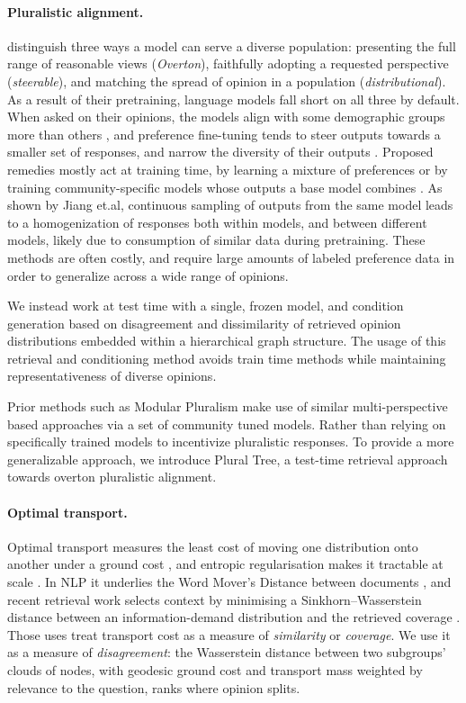 \documentclass[11pt]{article}
\begin{document}
\paragraph{Pluralistic alignment.}
\citet{sorensen2024roadmap} distinguish three ways a model can serve a diverse
population: presenting the full range of reasonable views (\emph{Overton}),
faithfully adopting a requested perspective (\emph{steerable}), and matching
the spread of opinion in a population (\emph{distributional}). As a result of their pretraining, language models
fall short on all three by default. When asked on their opinions, the models align with some
demographic groups more than others \citep{santurkar2023whose,
durmus2023towards}, and preference fine-tuning tends to steer outputs towards a smaller set of responses, and narrow the diversity
of their outputs \citep{kirk2024understanding}. Proposed remedies mostly act at
training time,  by learning a mixture of preferences
\citep{chakraborty2024maxmin} or by training community-specific models whose
outputs a base model combines \citep{feng-etal-2024-modular}. As shown by Jiang et.al, continuous sampling of outputs from the same model leads to a homogenization of responses both within models, and between different models, likely due to consumption of similar data during pretraining. These methods are often costly, and require large amounts of labeled preference data in order to generalize across a wide range of opinions.


We instead work
at test time with a single, frozen model, and condition generation based on disagreement and dissimilarity of retrieved opinion distributions embedded within a hierarchical graph structure. The usage of this retrieval and conditioning method avoids train time methods while maintaining representativeness of diverse opinions.


Prior methods such as Modular Pluralism make use of similar multi-perspective based approaches via a set of community tuned models. Rather than relying on specifically trained models to incentivize pluralistic responses. To provide a more generalizable approach, we introduce Plural Tree, a test-time retrieval approach towards overton pluralistic alignment.   

\paragraph{Optimal transport.}
Optimal transport measures the least cost of moving one distribution onto
another under a ground cost \citep{villani2008optimal, peyre2019computational},
and entropic regularisation makes it tractable at scale \citep{cuturi2013sinkhorn}.
In NLP it underlies the Word Mover's Distance between documents
\citep{kusner2015word}, and recent retrieval work selects context by minimising
a Sinkhorn--Wasserstein distance between an information-demand distribution and
the retrieved coverage \citep{zhang2026georag}. Those uses treat transport cost
as a measure of \emph{similarity} or \emph{coverage}. We use it as a measure of
\emph{disagreement}: the Wasserstein distance between two subgroups' clouds of
nodes, with geodesic ground cost and transport mass weighted by relevance to
the question, ranks where opinion splits.
\end{document}
